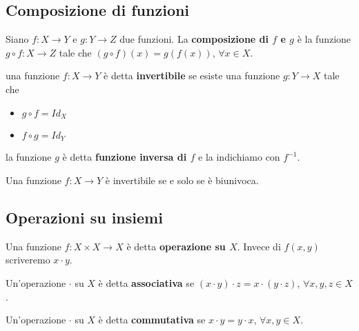 \documentclass[../main.tex]{subfiles}
\begin{document}
\subsection{Composizione di funzioni}
Siano $f: X \rightarrow Y$ e $g: Y \rightarrow Z$ due funzioni. La \textbf{composizione di $f$ e $g$}
è la funzione $g \circ f : X \rightarrow Z$ tale che $(g \circ f)(x) = g(f(x))$, $\forall x \in X$.

\begin{definition}
    una funzione $f: X \rightarrow Y$ è detta \textbf{invertibile} se esiste una funzione $g: Y \rightarrow X$ tale che
    \begin{itemize}
        \item $g \circ f = Id_X$
        \item $f \circ g = Id_Y$
    \end{itemize}
    la funzione $g$ è detta \textbf{funzione inversa di $f$} e la indichiamo con $f^{-1}$.
\end{definition}
\begin{remark}
    Una funzione $f: X \rightarrow Y$ è invertibile se e solo se è biunivoca.
\end{remark}

\subsection{Operazioni su insiemi}

\begin{definition}[Operazione]
    Una funzione $f: X \times X \rightarrow X$ è detta \textbf{operazione su $X$}. Invece di $f(x,y)$
    scriveremo $x \cdot y$.
\end{definition}

\begin{definition}
    Un'operazione $\cdot$ su $X$ è detta \textbf{associativa} se $(x \cdot y) \cdot z = x \cdot (y \cdot z)$,
    $\forall x,y,z \in X$.
\end{definition}

\begin{definition}
    Un'operazione $\cdot$ su $X$ è detta \textbf{commutativa} se $x \cdot y = y \cdot x$, $\forall x,y \in X$.
\end{definition}
\end{document}
